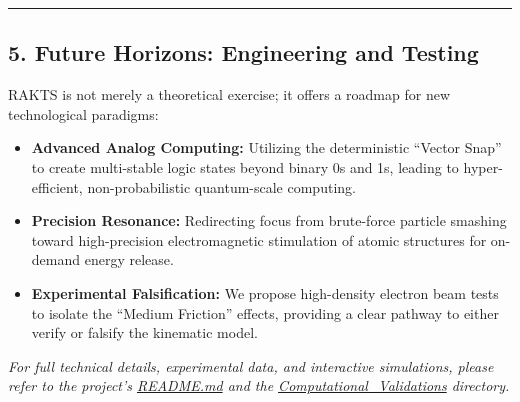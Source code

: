 \documentclass[
]{article}
\providecommand{\tightlist}{%
  \setlength{\itemsep}{0pt}\setlength{\parskip}{0pt}}
\begin{document}
\begin{center}\rule{0.5\linewidth}{0.5pt}\end{center}

\subsection{5. Future Horizons: Engineering and
Testing}\label{future-horizons-engineering-and-testing}

RAKTS is not merely a theoretical exercise; it offers a roadmap for new
technological paradigms:

\begin{itemize}
\tightlist
\item
  \textbf{Advanced Analog Computing:} Utilizing the deterministic
  ``Vector Snap'' to create multi-stable logic states beyond binary 0s
  and 1s, leading to hyper-efficient, non-probabilistic quantum-scale
  computing.
\item
  \textbf{Precision Resonance:} Redirecting focus from brute-force
  particle smashing toward high-precision electromagnetic stimulation of
  atomic structures for on-demand energy release.
\item
  \textbf{Experimental Falsification:} We propose high-density electron
  beam tests to isolate the ``Medium Friction'' effects, providing a
  clear pathway to either verify or falsify the kinematic model.
\end{itemize}

\emph{For full technical details, experimental data, and interactive
simulations, please refer to the project's
\href{../README.md}{README.md} and the
\href{./Computational_Validations/}{Computational\_Validations}
directory.}
\end{document}
